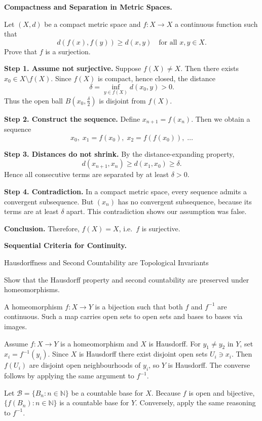 \begin{problem}[CP-II-0215]
\label{prob:cp-ii-0215}
\textbf{Compactness and Separation in Metric Spaces.}

\hspace*{1.5em}Let $(X,d)$ be a compact metric space and $f:X \to X$ a continuous function such that
\[
d(f(x), f(y)) \geq d(x,y) \quad \text{for all } x,y \in X.
\]
Prove that $f$ is a surjection.
\end{problem}

\begin{solution}
\textbf{Step 1. Assume not surjective.}
Suppose $f(X) \neq X$. Then there exists $x_0 \in X \setminus f(X)$.
Since $f(X)$ is compact, hence closed, the distance
\[
\delta = \inf_{y \in f(X)} d(x_0,y) > 0.
\]
Thus the open ball $B(x_0,\tfrac{\delta}{2})$ is disjoint from $f(X)$.

\medskip

\textbf{Step 2. Construct the sequence.}
Define $x_{n+1} = f(x_n)$. Then we obtain a sequence
\[
x_0, \; x_1=f(x_0), \; x_2=f(f(x_0)), \; \dots
\]

\medskip

\textbf{Step 3. Distances do not shrink.}
By the distance-expanding property,
\[
d(x_{n+1}, x_n) \geq d(x_1, x_0) \geq \delta.
\]
Hence all consecutive terms are separated by at least $\delta > 0$.

\medskip

\textbf{Step 4. Contradiction.}
In a compact metric space, every sequence admits a convergent subsequence.
But $(x_n)$ has no convergent subsequence, because its terms are at least $\delta$ apart.
This contradiction shows our assumption was false.

\medskip

\textbf{Conclusion.}
Therefore, $f(X)=X$, i.e.\ $f$ is surjective.
\end{solution}

\begin{problem}[CP-II-0218]
\label{prob:cp-ii-0218}
\textbf{Sequential Criteria for Continuity.}

\hspace*{1.5em}Hausdorffness and Second Countability are Topological Invariants

Show that the Hausdorff property and second countability are preserved under homeomorphisms.

A homeomorphism $f:X\to Y$ is a bijection such that both $f$ and $f^{-1}$ are continuous. Such a map carries open sets to open sets and bases to bases via images.

Assume $f:X\to Y$ is a homeomorphism and $X$ is Hausdorff. For $y_1\neq y_2$ in $Y$, set $x_i=f^{-1}(y_i)$. Since $X$ is Hausdorff there exist disjoint open sets $U_i\ni x_i$. Then $f(U_i)$ are disjoint open neighbourhoods of $y_i$, so $Y$ is Hausdorff. The converse follows by applying the same argument to $f^{-1}$.

Let $\mathcal{B}=\{B_n:n\in\mathbb{N}\}$ be a countable base for $X$. Because $f$ is open and bijective, $\{f(B_n):n\in\mathbb{N}\}$ is a countable base for $Y$. Conversely, apply the same reasoning to $f^{-1}$.
\end{problem}

